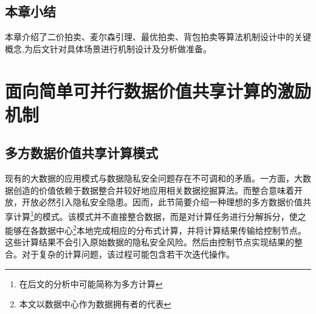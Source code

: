 \documentclass[promaster]{thesis-uestc}
\begin{document}
%
%
%
%

\section{本章小结}
本章介绍了二价拍卖、麦尔森引理、最优拍卖、背包拍卖等算法机制设计中的关键概念,为后文针对具体场景进行机制设计及分析做准备。

\chapter{面向简单可并行数据价值共享计算的激励机制}

\section{多方数据价值共享计算模式}
现有的大数据的应用模式与数据隐私安全问题存在不可调和的矛盾。一方面，大数据创造的价值依赖于数据整合并较好地应用相关数据挖掘算法。而整合意味着开放，开放必然引入隐私安全隐患。因而，此节简要介绍一种理想的多方数据价值共享计算\footnote{在后文的分析中可能简称为多方计算}的模式。该模式并不直接整合数据，而是对计算任务进行分解拆分，使之能够在各数据中心\footnote{本文以数据中心作为数据拥有者的代表}本地完成相应的分布式计算，并将计算结果传输给控制节点。这些计算结果不会引入原始数据的隐私安全风险。然后由控制节点实现结果的整合。对于复杂的计算问题，该过程可能包含若干次迭代操作。
\end{document}
